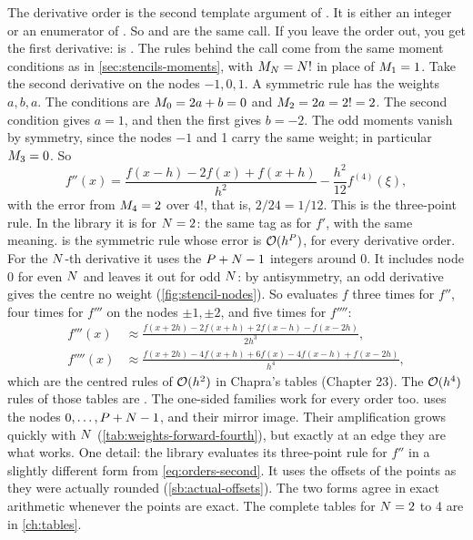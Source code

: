 The derivative order is the second template argument of . It is either an integer or an enumerator
of . So  and 
are the same call. If you leave the order out, you get the first derivative:  is
. The rules behind the call come from the same moment conditions as in
\cref{sec:stencils-moments}, with $M_{N} = N!$ in place of $M_{1} = 1$. Take the second derivative
on the nodes $-1, 0, 1$. A symmetric rule has the weights $a, b, a$. The conditions are $M_{0} = 2a + b = 0$ and
$M_{2} = 2a = 2! = 2$. The second condition gives $a = 1$, and then the first gives $b = -2$. The odd moments
vanish by symmetry, since the nodes $-1$ and 1 carry the same weight; in particular $M_{3} = 0$. So
\begin{equation}
  f''(x) = \frac{f(x - h) - 2 f(x) + f(x + h)}{h^2} - \frac{h^2}{12} f^{(4)}(\xi),
  \label{eq:orders-second}
\end{equation}
with the error from $M_{4} = 2$ over $4!$, that is, $2/24 = 1/12$. This is the three-point rule. In the library it
is  for $N = 2$: the same tag as for $f'$, with the same meaning.  is the
symmetric rule whose error is $\mathcal{O}(h^{P})$, for every derivative order. For the $N$-th derivative it
uses the $P + N - 1$ integers around 0. It includes node 0 for even $N$ and leaves it out for odd
$N$: by antisymmetry, an odd derivative gives the centre no weight (\cref{fig:stencil-nodes}). So
 evaluates $f$ three times for $f''$, four times for $f'''$ on the nodes $\pm 1, \pm 2$, and five
times for $f''''$:
\begin{align*}
  f'''(x)  &\approx \frac{f(x + 2h) - 2 f(x + h) + 2 f(x - h) - f(x - 2h)}{2 h^3}, \\
  f''''(x) &\approx \frac{f(x + 2h) - 4 f(x + h) + 6 f(x) - 4 f(x - h) + f(x - 2h)}{h^4},
\end{align*}
which are the centred rules of $\mathcal{O}(h^2)$ in Chapra's tables (Chapter 23).\cite{chapra2015} The $\mathcal{O}(h^4)$
rules of those tables are . The one-sided families work for every order too.  uses
the nodes $0, \ldots, P + N - 1$, and  their mirror image. Their amplification grows
quickly with $N$ (\cref{tab:weights-forward-fourth}), but exactly at an edge they are what works. One detail:
the library evaluates its three-point rule for $f''$ in a slightly different form from \cref{eq:orders-second}. It
uses the offsets of the points as they were actually rounded (\cref{sb:actual-offsets}). The two forms agree in exact
arithmetic whenever the points are exact. The complete tables for $N = 2$ to 4 are in \cref{ch:tables}.

